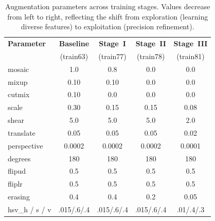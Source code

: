 \documentclass[12pt, titlepage]{article}
\begin{document}
\begin{table}[h]
  \centering
  \caption{Augmentation parameters across training stages.  Values
    decrease from left to right, reflecting the shift from exploration
    (learning diverse features) to exploitation (precision refinement).}
  \label{tab:augmentation}
  \small
  \begin{tabular}{@{}lcccc@{}}
    \toprule
    \textbf{Parameter} & \textbf{Baseline} & \textbf{Stage~I} & \textbf{Stage~II} & \textbf{Stage~III} \\
                       & (train63)         & (train77)        & (train78)         & (train81)          \\
    \midrule
    mosaic             & 1.0               & 0.8              & 0.0               & 0.0                \\
    mixup              & 0.10              & 0.10             & 0.0               & 0.0                \\
    cutmix             & 0.10              & 0.0              & 0.0               & 0.0                \\
    scale              & 0.30              & 0.15             & 0.15              & 0.08               \\
    shear              & 5.0               & 5.0              & 5.0               & 2.0                \\
    translate          & 0.05              & 0.05             & 0.05              & 0.02               \\
    perspective        & 0.0002            & 0.0002           & 0.0002            & 0.0001             \\
    degrees            & 180               & 180              & 180               & 180                \\
    flipud             & 0.5               & 0.5              & 0.5               & 0.5                \\
    fliplr             & 0.5               & 0.5              & 0.5               & 0.5                \\
    erasing            & 0.4               & 0.4              & 0.2               & 0.05               \\
    hsv\_h / s / v     & .015/.6/.4        & .015/.6/.4       & .015/.6/.4        & .01/.4/.3          \\
    \bottomrule
  \end{tabular}
\end{table}
\end{document}
